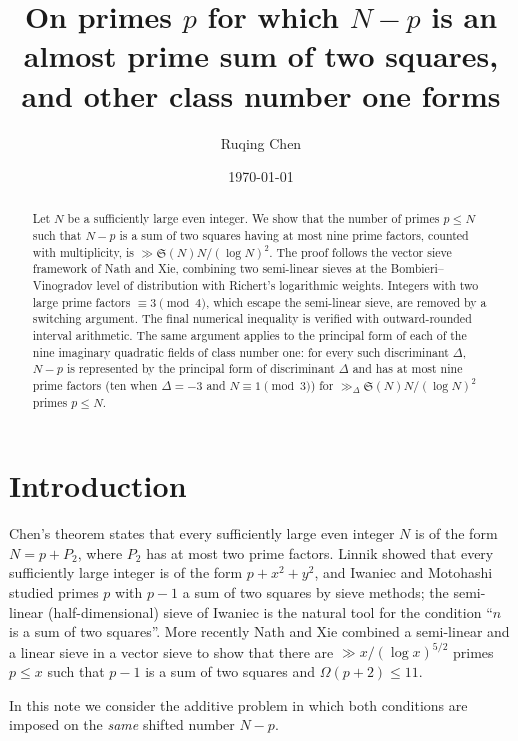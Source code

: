 \documentclass[11pt]{amsart}
\title[Almost prime values of class number one forms]{On primes $p$ for which $N-p$ is an almost prime sum
of two squares, and other class number one forms}
\author{Ruqing Chen}
\date{\today}
\theoremstyle{remark}
\newcommand{\Sg}{\mathfrak{S}}
\begin{document}
\begin{abstract}
Let $N$ be a sufficiently large even integer. We show that the number of primes $p\le N$ such that
$N-p$ is a sum of two squares having at most nine prime factors, counted with multiplicity, is
$\gg \Sg(N)N/(\log N)^2$. The proof follows the vector sieve framework of Nath and Xie, combining two
semi-linear sieves at the Bombieri--Vinogradov level of distribution with Richert's logarithmic weights.
Integers with two large prime factors $\equiv 3 \pmod 4$, which escape the semi-linear sieve, are removed by
a switching argument. The final numerical inequality is verified with outward-rounded interval arithmetic.
The same argument applies to the principal form of each of the nine imaginary quadratic fields of class
number one: for every such discriminant $\Delta$, $N-p$ is represented by the principal form of
discriminant $\Delta$ and has at most nine prime factors (ten when $\Delta=-3$ and $N\equiv1\pmod 3$) for
$\gg_\Delta\Sg(N)N/(\log N)^2$ primes $p\le N$.
\end{abstract}

\maketitle

\section{Introduction}

Chen's theorem \cite{Chen} states that every sufficiently large even integer $N$ is of the form
$N=p+P_2$, where $P_2$ has at most two prime factors. Linnik \cite{Linnik} showed that every sufficiently
large integer is of the form $p+x^2+y^2$, and Iwaniec \cite{IwaniecQF} and Motohashi \cite{Motohashi70}
studied primes $p$ with $p-1$ a sum of two squares by sieve methods; the semi-linear (half-dimensional)
sieve of Iwaniec \cite{IwaniecHalf} is the natural tool for the condition ``$n$ is a sum of two squares''.
More recently Nath and Xie \cite{NathXie} combined a semi-linear and a linear sieve in a vector sieve
\cite{BF} to show that there are $\gg x/(\log x)^{5/2}$ primes $p\le x$ such that $p-1$ is a sum of two
squares and $\Omega(p+2)\le 11$.

In this note we consider the additive problem in which both conditions are imposed on the \emph{same}
shifted number $N-p$.
\end{document}
